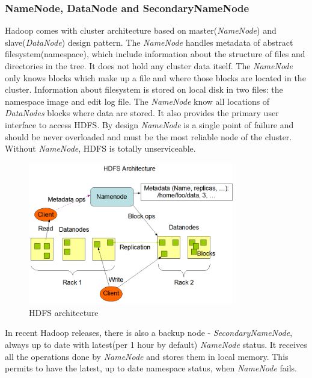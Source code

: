 \documentclass[a4paper,12pt,oneside]{report}
\begin{document}
	\subsubsection{NameNode, DataNode and SecondaryNameNode}
	Hadoop comes with cluster architecture based on master(\textit{NameNode}) and\\
	slave(\textit{DataNode}) design pattern. 
	The \textit{NameNode} handles metadata of abstract filesystem(namespace), which
	include
	information about the structure of files and directories in the tree.  It does
	not hold any cluster data itself. 
	The  \textit{NameNode} only knows blocks which make up a file and where those
	blocks are located in the cluster.
	Information about filesystem is stored on local disk in two files: the namespace
	image and edit log file. 
	The \textit{NameNode} know all locations of  \textit{DataNodes} blocks where
	data 
	are stored. It also provides the primary user interface to access HDFS. 
	By design \textit{NameNode}  is a single point of failure and should be never
	overloaded and must 
	be the most reliable node of the cluster.  Without \textit{NameNode}, HDFS is
	totally unserviceable. 
	\begin{figure}[!htbp]
		\centering
		\includegraphics[width=0.8\textwidth]{./img/hdfsarchitecture.png}
		\caption[HDFS architecture1]{\centering HDFS architecture \footnotemark}
		\label{hdfs_arch}
	\end{figure} 
	In recent Hadoop releases, there is also a backup node -
	\textit{SecondaryNameNode}, always up to date 
	with latest(per 1 hour by default) \textit{NameNode} status. It receives all the
	operations done by \textit{NameNode} and 
	stores them in local memory. This permits to have the latest, up to date
	namespace status, when \textit{NameNode} fails. 
	
\end{document}
